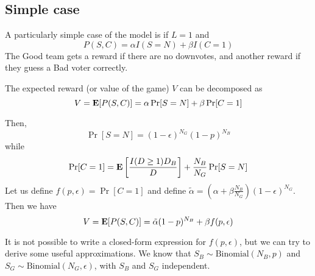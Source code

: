 \documentclass[11pt]{article}
\begin{document}
\subsection{Simple case}

A particularly simple case of the model is if $L=1$ and
\[
P(S,C) = \alpha I(S = N) + \beta I(C = 1)
\]
The Good team gets a reward if there are no downvotes, and another
reward if they guess a Bad voter correctly.

The expected reward (or value of the game) $V$ can be decomposed as
\[
V = \textbf{E}[P(S,C)] = \alpha \Pr[S = N] + \beta \Pr[C=1]
\]

Then,
\[
\Pr[S = N] = (1-\epsilon)^{N_G}(1-p)^{N_B}
\]
while
\[
\Pr[C = 1] = \textbf{E}\left[\frac{I(D \geq 1)D_B}{D}\right] + \frac{N_B}{N_G}\Pr[S = N]
\]
Let us define $f(p,\epsilon) = \Pr[C=1]$ and define $\tilde{\alpha} = (\alpha + \beta\frac{N_B}{N_G})(1-\epsilon)^{N_G}$.
Then we have
\[
V = \textbf{E}[P(S,C)] = \tilde{\alpha} (1-p)^{N_B} + \beta f(p, \epsilon)
\]

It is not possible to write a closed-form expression for
$f(p,\epsilon)$, but we can try to derive some useful approximations.
We know that $S_B \sim \text{Binomial}(N_B, p)$ and $S_G \sim
\text{Binomial}(N_G, \epsilon)$, with $S_B$ and $S_G$ independent.
\end{document}
